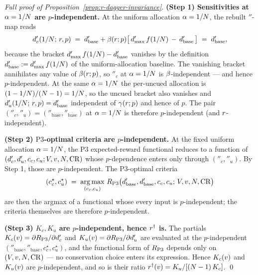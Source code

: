 \begin{proof}[Full proof of Proposition~\ref{prop:r-dagger-invariance}]
\textbf{(Step 1) Sensitivities at $\alpha = 1/N$ are
$p$-independent.} At the uniform allocation $\alpha = 1/N$,
the rebuilt $\dprime$-map reads
\begin{equation*}
  d'_c(1/N;\, r, p)
  \;=\;
  d'_{\mathrm{base}}
  + \beta(r; p)
    \bigl[\,d'_{\max}\,f(1/N)
            \,-\, d'_{\mathrm{base}}\,\bigr]
  \;=\;
  d'_{\mathrm{base}},
\end{equation*}
because the bracket $d'_{\max}\,f(1/N) -
d'_{\mathrm{base}}$ vanishes by the definition
$d'_{\mathrm{base}} := d'_{\max}\,f(1/N)$ of the
uniform-allocation baseline. The vanishing bracket annihilates
any value of $\beta(r; p)$, so $\dprime_c$ at
$\alpha = 1/N$ is $\beta$-independent — and hence
$p$-independent. At the same $\alpha = 1/N$ the per-uncued
allocation is $(1 - 1/N)/(N - 1) = 1/N$, so the
uncued bracket also vanishes and
$d'_u(1/N;\, r, p) = d'_{\mathrm{base}}$
independent of $\gamma(r; p)$ and hence of $p$. The pair
$(\dprime_c, \dprime_u) = (\dprime_{\mathrm{base}},
\dprime_{\mathrm{base}})$ at $\alpha = 1/N$ is therefore
$p$-independent (and $r$-independent).

\textbf{(Step 2) $\textrm{P3}$-optimal criteria are $p$-independent.}
At the fixed uniform allocation $\alpha = 1/N$, the $\textrm{P3}$
expected-reward functional reduces to a function of
$(d'_c, d'_u, c_c, c_u; V, v, N, \mathrm{CR})$ whose
$p$-dependence enters only through $(\dprime_c, \dprime_u)$. By
Step 1, those are $p$-independent. The $\textrm{P3}$-optimal criteria
\begin{equation*}
  (c_c^\star, c_u^\star)
  \;=\;
  \operatorname*{arg\,max}_{(c_c, c_u)}\,
    R_{\mathrm{P3}}\bigl(d'_{\mathrm{base}},
                       d'_{\mathrm{base}},
                       c_c, c_u;\,
                       V, v, N, \mathrm{CR}\bigr)
\end{equation*}
are then the argmax of a functional whose every input is
$p$-independent; the criteria themselves are therefore
$p$-independent.

\textbf{(Step 3) $K_c, K_u$ are $p$-independent, hence $r^{\dagger}$
is.} The partials
$K_c(v) = \partial R_{\mathrm{P3}}/\partial d'_c$ and
$K_u(v) = \partial R_{\mathrm{P3}}/\partial d'_u$ are evaluated
at the $p$-independent
$(\dprime_{\mathrm{base}}, \dprime_{\mathrm{base}}, c_c^\star,
c_u^\star)$, and the functional form of $R_{\mathrm{P3}}$ depends only on
$(V, v, N, \mathrm{CR})$ — no conservation choice enters its
expression. Hence $K_c(v)$ and $K_u(v)$ are $p$-independent,
and so is their ratio
$r^{\dagger}(v) = K_u/[(N - 1)\,K_c]$. \qed
\end{proof}

